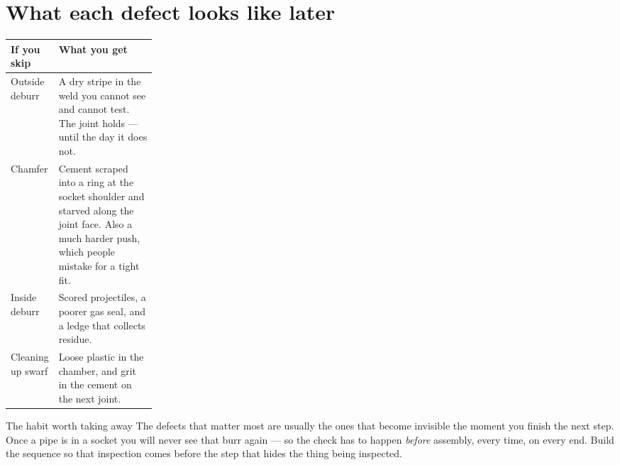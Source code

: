 \section{What each defect looks like later}
\begin{tabularx}{\linewidth}{@{}p{0.24\linewidth}L@{}}
\toprule
\textbf{If you skip} & \textbf{What you get}\\
\midrule
Outside deburr & A dry stripe in the weld you cannot see and cannot test. The joint holds --- until the day it does not.\\
Chamfer & Cement scraped into a ring at the socket shoulder and starved along the joint face. Also a much harder push, which people mistake for a tight fit.\\
Inside deburr & Scored projectiles, a poorer gas seal, and a ledge that collects residue.\\
Cleaning up swarf & Loose plastic in the chamber, and grit in the cement on the next joint.\\
\bottomrule
\end{tabularx}


\begin{telospanel}{The habit worth taking away}
The defects that matter most are usually the ones that become invisible the
moment you finish the next step. Once a pipe is in a socket you will never see
that burr again --- so the check has to happen \emph{before} assembly, every
time, on every end. Build the sequence so that inspection comes before the step
that hides the thing being inspected.
\end{telospanel}


